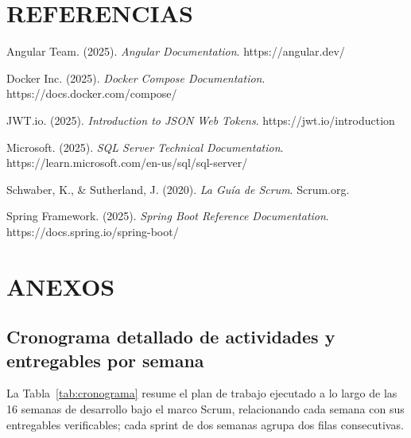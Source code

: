 \documentclass[11pt,a4paper]{report}
\begin{document}
\chapter*{REFERENCIAS}
\begin{list}{}{
    \setlength{\leftmargin}{1.27cm}
    \setlength{\itemindent}{-1.27cm}
    \setlength{\listparindent}{\itemindent}
    \setlength{\parsep}{0pt}
}
\item Angular Team. (2025). \textit{Angular Documentation}. https://angular.dev/
\item Docker Inc. (2025). \textit{Docker Compose Documentation}. https://docs.docker.com/compose/
\item JWT.io. (2025). \textit{Introduction to JSON Web Tokens}. https://jwt.io/introduction
\item Microsoft. (2025). \textit{SQL Server Technical Documentation}. https://learn.microsoft.com/en-us/sql/sql-server/
\item Schwaber, K., \& Sutherland, J. (2020). \textit{La Guía de Scrum}. Scrum.org.
\item Spring Framework. (2025). \textit{Spring Boot Reference Documentation}. https://docs.spring.io/spring-boot/
\end{list}

\chapter*{ANEXOS}
\setcounter{section}{0}
\renewcommand{\thesection}{A.\arabic{section}}

\section{Cronograma detallado de actividades y entregables por semana}
La Tabla~\ref{tab:cronograma} resume el plan de trabajo ejecutado a lo largo de las 16 semanas de desarrollo bajo el marco Scrum, relacionando cada semana con sus entregables verificables; cada sprint de dos semanas agrupa dos filas consecutivas.
\end{document}
